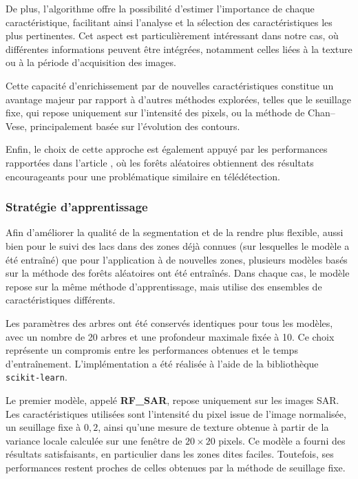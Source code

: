 \documentclass[11pt,a4paper]{article}
\begin{document}
De plus, l’algorithme offre la possibilité d’estimer l’importance de chaque caractéristique, facilitant ainsi l’analyse et la 
sélection des caractéristiques les plus pertinentes. Cet aspect est particulièrement intéressant dans notre cas, où différentes 
informations peuvent être intégrées, notamment celles liées à la texture ou à la période d’acquisition des images.

Cette capacité d’enrichissement par de nouvelles caractéristiques constitue un avantage majeur par rapport à d’autres méthodes 
explorées, telles que le seuillage fixe, qui repose uniquement sur l’intensité des pixels, ou la méthode de Chan--Vese, 
principalement basée sur l’évolution des contours.

Enfin, le choix de cette approche est également appuyé par les performances rapportées dans l’article \cite{guiot2023segmentation}, 
où les forêts aléatoires obtiennent des résultats encourageants pour une problématique similaire en télédétection.

\subsubsection{Stratégie d’apprentissage}

Afin d’améliorer la qualité de la segmentation et de la rendre plus flexible, aussi bien pour le suivi des lacs dans des zones déjà connues (sur lesquelles le modèle a été entraîné) que pour l’application à de nouvelles zones, plusieurs modèles basés sur la méthode des forêts aléatoires ont été entraînés. Dans chaque cas, le modèle repose sur la même méthode d’apprentissage, mais utilise des ensembles de caractéristiques différents.

Les paramètres des arbres ont été conservés identiques pour tous les modèles, avec un nombre de 20 arbres et une profondeur maximale fixée à 10. Ce choix représente un compromis entre les performances obtenues et le temps d’entraînement. L’implémentation a été réalisée à l’aide de la bibliothèque \texttt{scikit-learn}.

Le premier modèle, appelé \textbf{RF\_SAR}, repose uniquement sur les images SAR. Les caractéristiques utilisées sont l’intensité du pixel issue de l’image normalisée, un seuillage fixe à $0{,}2$, ainsi qu’une mesure de texture obtenue à partir de la variance locale calculée sur une fenêtre de $20 \times 20$ pixels. Ce modèle a fourni des résultats satisfaisants, en particulier dans les zones dites faciles. Toutefois, ses performances restent proches de celles obtenues par la méthode de seuillage fixe.
\end{document}
